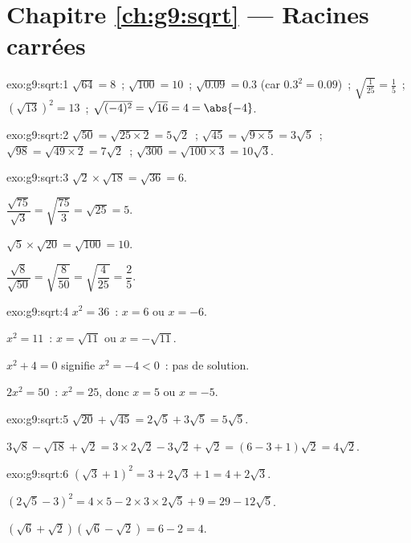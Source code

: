 \section*{Chapitre \ref{ch:g9:sqrt} --- Racines carrées}

\begin{solution}{exo:g9:sqrt:1}
$\sqrt{64} = 8$~; \quad $\sqrt{100} = 10$~; \quad
$\sqrt{0.09} = 0.3$ (car $0.3^2 = 0.09$)~; \quad
$\sqrt{\frac{1}{25}} = \frac15$~; \quad
$\left(\sqrt{13}\right)^2 = 13$~; \quad
$\sqrt{(-4)^2} = \sqrt{16} = 4 = \abs{-4}$.
\end{solution}

\begin{solution}{exo:g9:sqrt:2}
$\sqrt{50} = \sqrt{25 \times 2} = 5\sqrt2$~; \quad
$\sqrt{45} = \sqrt{9 \times 5} = 3\sqrt5$~; \quad
$\sqrt{98} = \sqrt{49 \times 2} = 7\sqrt2$~; \quad
$\sqrt{300} = \sqrt{100 \times 3} = 10\sqrt3$.
\end{solution}

\begin{solution}{exo:g9:sqrt:3}
$\sqrt2 \times \sqrt{18} = \sqrt{36} = 6$.

$\dfrac{\sqrt{75}}{\sqrt3} = \sqrt{\dfrac{75}{3}} = \sqrt{25} = 5$.

$\sqrt5 \times \sqrt{20} = \sqrt{100} = 10$.

$\dfrac{\sqrt8}{\sqrt{50}} = \sqrt{\dfrac{8}{50}} = \sqrt{\dfrac{4}{25}}
= \dfrac25$.
\end{solution}

\begin{solution}{exo:g9:sqrt:4}
$x^2 = 36$~: $x = 6$ ou $x = -6$.

$x^2 = 11$~: $x = \sqrt{11}$ ou $x = -\sqrt{11}$.

$x^2 + 4 = 0$ signifie $x^2 = -4 < 0$~: pas de solution.

$2x^2 = 50$~: $x^2 = 25$, donc $x = 5$ ou $x = -5$.
\end{solution}

\begin{solution}{exo:g9:sqrt:5}
$\sqrt{20} + \sqrt{45} = 2\sqrt5 + 3\sqrt5 = 5\sqrt5$.

$3\sqrt8 - \sqrt{18} + \sqrt2 = 3 \times 2\sqrt2 - 3\sqrt2 + \sqrt2
= (6 - 3 + 1)\sqrt2 = 4\sqrt2$.
\end{solution}

\begin{solution}{exo:g9:sqrt:6}
$\left(\sqrt3 + 1\right)^2 = 3 + 2\sqrt3 + 1 = 4 + 2\sqrt3$.

$\left(2\sqrt5 - 3\right)^2 = 4 \times 5 - 2 \times 3 \times 2\sqrt5 + 9
= 29 - 12\sqrt5$.

$\left(\sqrt6 + \sqrt2\right)\left(\sqrt6 - \sqrt2\right) = 6 - 2 = 4$.
\end{solution}


